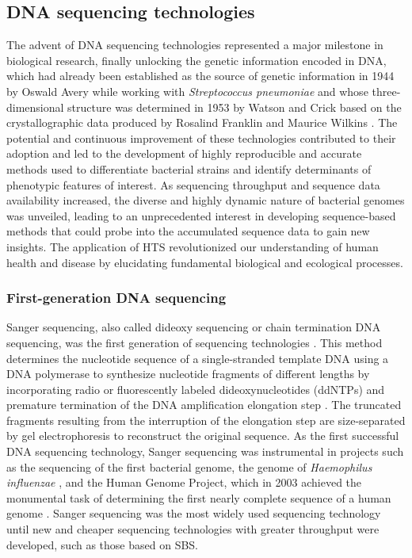 \subsection{DNA sequencing technologies}

The advent of \ac{DNA} sequencing technologies represented a major milestone in biological research, finally unlocking the genetic information encoded in \ac{DNA}, which had already been established as the source of genetic information in 1944 by Oswald Avery while working with \textit{Streptococcus pneumoniae} \cite{avery_studies_1944} and whose three-dimensional structure was determined in 1953 by Watson and Crick based on the crystallographic data produced by Rosalind Franklin and Maurice Wilkins \cite{watson_molecular_1953, zallen_despite_2003}. The potential and continuous improvement of these technologies contributed to their adoption and led to the development of highly reproducible and accurate methods used to differentiate bacterial strains and identify determinants of phenotypic features of interest. As sequencing throughput and sequence data availability increased, the diverse and highly dynamic nature of bacterial genomes was unveiled, leading to an unprecedented interest in developing sequence-based methods that could probe into the accumulated sequence data to gain new insights. The application of \ac{HTS} revolutionized our understanding of human health and disease by elucidating fundamental biological and ecological processes.

\subsubsection{First-generation DNA sequencing}

Sanger sequencing, also called dideoxy sequencing or chain termination \ac{DNA} sequencing, was the first generation of sequencing technologies \cite{sanger_dna_1977}. This method determines the nucleotide sequence of a single-stranded template \ac{DNA} using a \ac{DNA} polymerase to synthesize nucleotide fragments of different lengths by incorporating radio or fluorescently labeled dideoxynucleotides (ddNTPs) and premature termination of the DNA amplification elongation step \cite{heather_sequence_2016, rodriguez_genesis_2023}. The truncated fragments resulting from the interruption of the elongation step are size-separated by gel electrophoresis to reconstruct the original sequence. As the first successful \ac{DNA} sequencing technology, Sanger sequencing was instrumental in projects such as the sequencing of the first bacterial genome, the genome of \textit{Haemophilus influenzae} \cite{fleischmann_whole-genome_1995}, and the Human Genome Project, which in 2003 achieved the monumental task of determining the first nearly complete sequence of a human genome \cite{international_human_genome_sequencing_consortium_finishing_2004}.
Sanger sequencing was the most widely used sequencing technology until new and cheaper sequencing technologies with greater throughput were developed, such as those based on \ac{SBS}.

